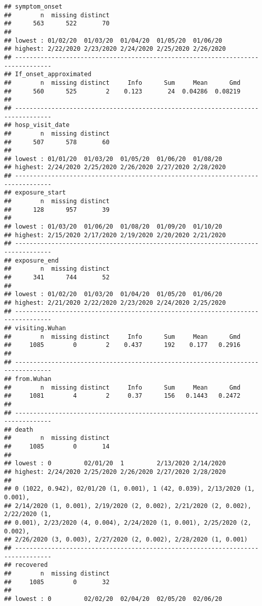 \documentclass[
]{article}
\begin{document}
\begin{verbatim}
## symptom_onset 
##        n  missing distinct 
##      563      522       70 
## 
## lowest : 01/02/20  01/03/20  01/04/20  01/05/20  01/06/20 
## highest: 2/22/2020 2/23/2020 2/24/2020 2/25/2020 2/26/2020
## --------------------------------------------------------------------------------
## If_onset_approximated 
##        n  missing distinct     Info      Sum     Mean      Gmd 
##      560      525        2    0.123       24  0.04286  0.08219 
## 
## --------------------------------------------------------------------------------
## hosp_visit_date 
##        n  missing distinct 
##      507      578       60 
## 
## lowest : 01/01/20  01/03/20  01/05/20  01/06/20  01/08/20 
## highest: 2/24/2020 2/25/2020 2/26/2020 2/27/2020 2/28/2020
## --------------------------------------------------------------------------------
## exposure_start 
##        n  missing distinct 
##      128      957       39 
## 
## lowest : 01/03/20  01/06/20  01/08/20  01/09/20  01/10/20 
## highest: 2/15/2020 2/17/2020 2/19/2020 2/20/2020 2/21/2020
## --------------------------------------------------------------------------------
## exposure_end 
##        n  missing distinct 
##      341      744       52 
## 
## lowest : 01/02/20  01/03/20  01/04/20  01/05/20  01/06/20 
## highest: 2/21/2020 2/22/2020 2/23/2020 2/24/2020 2/25/2020
## --------------------------------------------------------------------------------
## visiting.Wuhan 
##        n  missing distinct     Info      Sum     Mean      Gmd 
##     1085        0        2    0.437      192    0.177   0.2916 
## 
## --------------------------------------------------------------------------------
## from.Wuhan 
##        n  missing distinct     Info      Sum     Mean      Gmd 
##     1081        4        2     0.37      156   0.1443   0.2472 
## 
## --------------------------------------------------------------------------------
## death 
##        n  missing distinct 
##     1085        0       14 
## 
## lowest : 0         02/01/20  1         2/13/2020 2/14/2020
## highest: 2/24/2020 2/25/2020 2/26/2020 2/27/2020 2/28/2020
## 
## 0 (1022, 0.942), 02/01/20 (1, 0.001), 1 (42, 0.039), 2/13/2020 (1, 0.001),
## 2/14/2020 (1, 0.001), 2/19/2020 (2, 0.002), 2/21/2020 (2, 0.002), 2/22/2020 (1,
## 0.001), 2/23/2020 (4, 0.004), 2/24/2020 (1, 0.001), 2/25/2020 (2, 0.002),
## 2/26/2020 (3, 0.003), 2/27/2020 (2, 0.002), 2/28/2020 (1, 0.001)
## --------------------------------------------------------------------------------
## recovered 
##        n  missing distinct 
##     1085        0       32 
## 
## lowest : 0         02/02/20  02/04/20  02/05/20  02/06/20 

\end{verbatim}
\end{document}
